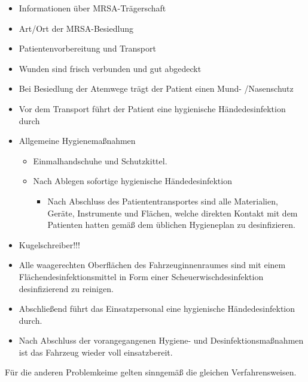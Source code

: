\begin{itemize}
    \item Informationen \"uber MRSA-Tr\"agerschaft
    \item Art/Ort der MRSA-Besiedlung
    \item Patientenvorbereitung und Transport
    \item Wunden sind frisch verbunden und gut abgedeckt
    \item Bei Besiedlung der Atemwege tr\"agt der Patient einen Mund-
    /Nasenschutz
    \item Vor dem Transport f\"uhrt der Patient eine hygienische
    H\"andedesinfektion durch
    \item Allgemeine Hygienema{\ss}nahmen
    \begin{itemize}
        \item Einmalhandschuhe und Schutzkittel.
        \item Nach Ablegen sofortige hygienische H\"andedesinfektion
        \begin{itemize}
            \item Nach Abschluss des Patiententransportes sind alle Materialien,
            Ger\"ate, Instrumente und Fl\"achen, welche direkten Kontakt mit dem
            Patienten hatten gem\"a{\ss} dem \"ublichen Hygieneplan zu
            desinfizieren.
        \end{itemize}
    \end{itemize}
    \item Kugelschreiber!!!
    \item Alle waagerechten Oberfl\"achen des Fahrzeuginnenraumes sind mit
    einem Fl\"achendesinfektionsmittel in Form einer
    Scheuerwischdesinfektion desinfizierend zu reinigen.
    \item Abschlie{\ss}end f\"uhrt das Einsatzpersonal eine hygienische
    H\"andedesinfektion durch.
    \item Nach Abschluss der vorangegangenen Hygiene- und
    Desinfektionsma{\ss}nahmen ist das Fahrzeug wieder voll einsatzbereit.
\end{itemize}

F\"ur die anderen Problemkeime  gelten sinngem\"a{\ss} die gleichen
Verfahrensweisen.





